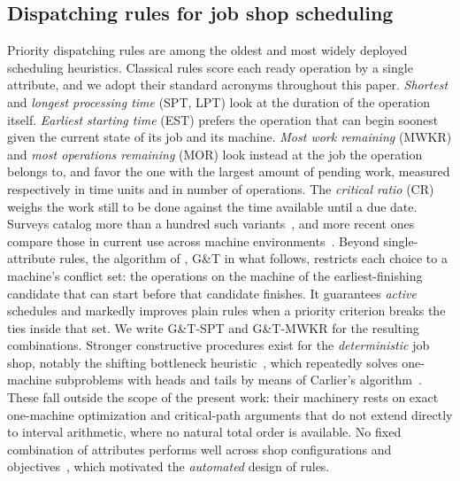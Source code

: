 \documentclass[preprint,number,sort&compress,12pt]{elsarticle}
\begin{document}
\subsection{Dispatching rules for job shop scheduling}
Priority dispatching rules are among the oldest and most widely
deployed scheduling heuristics. Classical rules
score each ready operation by a single attribute, and we adopt their
standard acronyms throughout this paper. \emph{Shortest} and
\emph{longest processing time} (SPT, LPT) look at the duration of the
operation itself. \emph{Earliest starting time} (EST) prefers the
operation that can begin soonest given the current state of its job and
its machine. \emph{Most work remaining} (MWKR) and \emph{most operations
remaining} (MOR) look instead at the job the operation belongs to, and
favor the one with the largest amount of pending work, measured
respectively in time units and in number of operations. The
\emph{critical ratio} (CR) weighs the work still to be done against the
time available until a due date. Surveys catalog more than a hundred
such variants~\citep{Panwalkar1977,Haupt1989}, and more recent ones
compare those in current use across machine
environments~\citep{Durasevic2018}. Beyond single-attribute rules, the algorithm of
\citet{Giffler1960}, G\&T in what follows, restricts each choice to a
machine's conflict set: the operations on the machine of the
earliest-finishing candidate that can start before that candidate
finishes. It guarantees \emph{active} schedules and markedly improves
plain rules when a priority criterion breaks the ties inside that set.
We write G\&T-SPT and G\&T-MWKR for the resulting combinations. Stronger constructive procedures exist
for the \emph{deterministic} job shop, notably the shifting bottleneck
heuristic~\citep{Adams1988}, which repeatedly solves one-machine
subproblems with heads and tails by means of Carlier's
algorithm~\citep{Carlier1982}. These fall outside the scope of the present work: their machinery rests
on exact one-machine optimization and critical-path arguments that do
not extend directly to interval arithmetic, where no natural total order
is available. No fixed combination of attributes performs well across shop
configurations and objectives~\citep{Haupt1989}, which motivated the
\emph{automated} design of rules.
\end{document}

